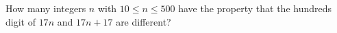 How many integers $n$ with $10 \le n \le 500$ have the property that the hundreds digit of $17n$ and $17n+17$ are different?
